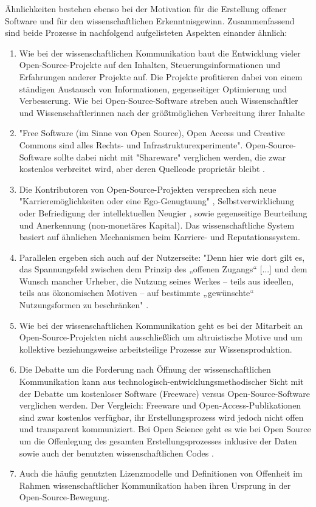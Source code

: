 Ähnlichkeiten bestehen ebenso bei der Motivation für die Erstellung offener Software und für den wissenschaftlichen Erkenntnisgewinn. Zusammenfassend sind beide Prozesse in nachfolgend aufgelisteten Aspekten einander ähnlich:
\begin{enumerate}
\item Wie bei der wissenschaftlichen Kommunikation baut die Entwicklung vieler Open-Source-Projekte auf den Inhalten, Steuerungsinformationen und Erfahrungen anderer Projekte auf. Die Projekte profitieren dabei von einem ständigen Austausch von Informationen, gegenseitiger Optimierung und Verbesserung. Wie bei Open-Source-Software streben auch Wissenschaftler und Wissenschaftlerinnen nach der größtmöglichen Verbreitung ihrer Inhalte
\item "Free Software (im Sinne von Open Source), Open Access und Creative Commons sind alles Rechts- und Infrastrukturexperimente"\cite{Kelty_2004}. Open-Source-Software sollte dabei nicht mit "Shareware" verglichen werden, die zwar kostenlos verbreitet wird, aber deren Quellcode proprietär bleibt \cite{Lerner_2001}.
\item Die Kontributoren von Open-Source-Projekten versprechen sich neue "Karrieremöglichkeiten oder eine Ego-Genugtuung" \cite{Lerner_2001}, Selbstverwirklichung oder Befriedigung der intellektuellen Neugier \cite{Willinsky_2005}, sowie gegenseitige Beurteilung und Anerkennung (non-monetäres Kapital). Das wissenschaftliche System basiert auf ähnlichen Mechanismen beim Karriere- und Reputationssystem.
\item Parallelen ergeben sich auch auf der Nutzerseite: "Denn hier wie dort gilt es, das Spannungsfeld zwischen dem Prinzip des „offenen Zugangs“ [...] und dem Wunsch mancher Urheber, die Nutzung seines Werkes – teils aus ideellen, teils aus ökonomischen Motiven – auf bestimmte „gewünschte“ Nutzungsformen zu beschränken" \cite{Dorschel_2006}.
\item Wie bei der wissenschaftlichen Kommunikation geht es bei der Mitarbeit an Open-Source-Projekten nicht ausschließlich um altruistische Motive \cite{Lerner_2001} und um kollektive beziehungsweise arbeitsteilige Prozesse zur Wissensproduktion.
\item Die Debatte um die Forderung nach Öffnung der wissenschaftlichen Kommunikation kann aus technologisch-entwicklungsmethodischer Sicht mit der Debatte um kostenloser Software (Freeware) versus Open-Source-Software verglichen werden. Der Vergleich: Freeware und Open-Access-Publikationen sind zwar kostenlos verfügbar, ihr Erstellungsprozess wird jedoch nicht offen und transparent kommuniziert. Bei Open Science geht es wie bei Open Source um die Offenlegung des gesamten Erstellungsprozesses inklusive der Daten \cite{Grand_2012} sowie auch der benutzten wissenschaftlichen Codes \cite{Hey_2015}.
\item Auch die häufig genutzten Lizenzmodelle und Definitionen von Offenheit im Rahmen wissenschaftlicher Kommunikation haben ihren Ursprung in der Open-Source-Bewegung.
\end{enumerate}

